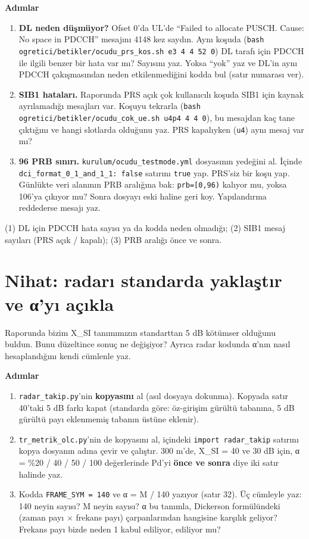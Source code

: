 \documentclass[11pt,a4paper]{article}
\begin{document}
\textbf{Adımlar}
\begin{enumerate}[leftmargin=1.6em]
\item \textbf{DL neden düşmüyor?} Ofset 0'da UL'de ``Failed to allocate PUSCH. Cause: No space in PDCCH'' mesajını 4148 kez saydın. Aynı koşuda (\texttt{bash ogretici/betikler/ocudu\_prs\_kos.sh e3 4 4 52 0}) DL tarafı için PDCCH ile ilgili benzer bir hata var mı? Sayısını yaz. Yoksa ``yok'' yaz ve DL'in aynı PDCCH çakışmasından neden etkilenmediğini kodda bul (satır numarası ver).
\item \textbf{SIB1 hataları.} Raporunda PRS açık çok kullanıcılı koşuda SIB1 için kaynak ayrılamadığı mesajları var. Koşuyu tekrarla (\texttt{bash ogretici/betikler/ocudu\_cok\_ue.sh u4p4 4 4 0}), bu mesajdan kaç tane çıktığını ve hangi slotlarda olduğunu yaz. PRS kapalıyken (\texttt{u4}) aynı mesaj var mı?
\item \textbf{96 PRB sınırı.} \texttt{kurulum/ocudu\_testmode.yml} dosyasının yedeğini al. İçinde \texttt{dci\_format\_0\_1\_and\_1\_1: false} satırını \texttt{true} yap. PRS'siz bir koşu yap. Günlükte veri alanının PRB aralığına bak: \texttt{prb=[0,96)} kalıyor mu, yoksa 106'ya çıkıyor mu? Sonra dosyayı eski haline geri koy. Yapılandırma reddederse mesajı yaz.
\end{enumerate}

\begin{teslim}
(1) DL için PDCCH hata sayısı ya da kodda neden olmadığı; (2) SIB1 mesaj sayıları (PRS açık / kapalı); (3) PRB aralığı önce ve sonra.
\end{teslim}

\clearpage
\section*{Nihat: radarı standarda yaklaştır ve α'yı açıkla}
\begin{amac}
Raporunda bizim X\_SI tanımımızın standarttan 5 dB kötümser olduğunu buldun. Bunu düzeltince sonuç ne değişiyor? Ayrıca radar kodunda α'nın nasıl hesaplandığını kendi cümlenle yaz.
\end{amac}

\textbf{Adımlar}
\begin{enumerate}[leftmargin=1.6em]
\item \texttt{radar\_takip.py}'nin \textbf{kopyasını} al (asıl dosyaya dokunma). Kopyada satır 40'taki 5 dB farkı kapat (standarda göre: öz-girişim gürültü tabanına, 5 dB gürültü payı eklenmemiş tabanın üstüne eklenir).
\item \texttt{tr\_metrik\_olc.py}'nin de kopyasını al, içindeki \texttt{import radar\_takip} satırını kopya dosyanın adına çevir ve çalıştır. 300 m'de, X\_SI = 40 ve 30 dB için, α = \%20 / 40 / 50 / 100 değerlerinde Pd'yi \textbf{önce ve sonra} diye iki satır halinde yaz.
\item Kodda \texttt{FRAME\_SYM = 140} ve α = M / 140 yazıyor (satır 32). Üç cümleyle yaz: 140 neyin sayısı? M neyin sayısı? α bu tanımla, Dickerson formülündeki (zaman payı $\times$ frekans payı) çarpanlarından hangisine karşılık geliyor? Frekans payı bizde neden 1 kabul ediliyor, ediliyor mu?
\end{enumerate}
\end{document}
